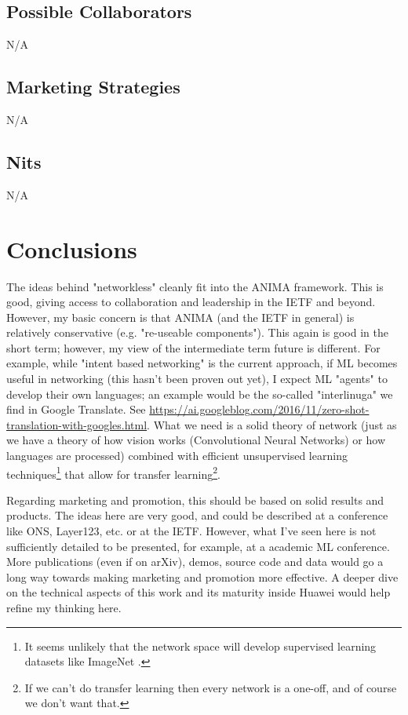 \documentclass[11pt, oneside]{article}   	%
\begin{document}
\subsection{Possible Collaborators}
\label{slide27:possible_collaborators}
N/A

\subsection{Marketing Strategies}
\label{slide27:marketing_strategies}
N/A

\subsection{Nits}
\label{slide27:nits}
N/A

\section{Conclusions}
\label{sec:conclusions}
The ideas behind "networkless" cleanly fit into the ANIMA framework. This is good, giving access to collaboration and leadership in the IETF and beyond. However, my
basic concern is that ANIMA (and the IETF in general) is relatively conservative (e.g. "re-useable components"). This again is good in the short term;
however, my view of the intermediate term future is different. For example, while "intent based networking" is the current approach, if ML becomes useful in networking (this
hasn't been proven out yet), I expect ML "agents" to develop their own languages; an example would be the so-called "interlinuga" we find in Google Translate. See 
\url{https://ai.googleblog.com/2016/11/zero-shot-translation-with-googles.html}. What we need is a solid theory of network (just as we have a theory of how vision
works (Convolutional Neural Networks) or how languages are processed) combined with efficient unsupervised learning techniques\footnote{It seems unlikely that the network 
space will develop supervised learning datasets like ImageNet \cite{imagenet_cvpr09}.} that allow for transfer learning\footnote{If we can't do transfer
learning then every network is a one-off, and of course we don't want that.}.


\bigskip
\noindent
Regarding marketing and promotion, this should be based on solid results and products. The ideas here are very good, and could be described at a conference like ONS, Layer123, etc.
or at the IETF.  However, what I've seen here is not sufficiently detailed to be presented, for example, at a academic ML conference. More publications (even if on arXiv), demos, 
source code and data would go a long way towards making marketing and promotion more effective. A deeper dive on the technical aspects of this work and its maturity inside Huawei
would help refine my thinking here.


\newpage


\end{document}
